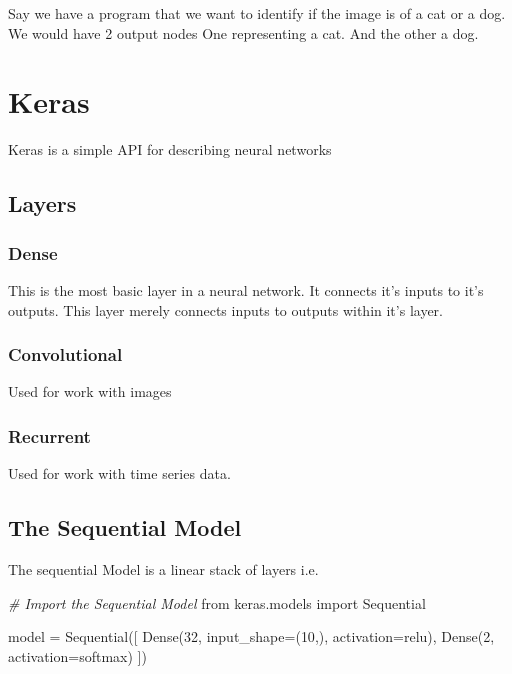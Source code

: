 \documentclass[
]{article}
\newenvironment{Shaded}{}{}
\newcommand{\CommentTok}[1]{\textcolor[rgb]{0.38,0.63,0.69}{\textit{#1}}}
\newcommand{\DecValTok}[1]{\textcolor[rgb]{0.25,0.63,0.44}{#1}}
\newcommand{\ImportTok}[1]{#1}
\newcommand{\NormalTok}[1]{#1}
\newcommand{\OperatorTok}[1]{\textcolor[rgb]{0.40,0.40,0.40}{#1}}
\newcommand{\StringTok}[1]{\textcolor[rgb]{0.25,0.44,0.63}{#1}}
\begin{document}
Say we have a program that we want to identify if the image is of a cat
or a dog. We would have 2 output nodes One representing a cat. And the
other a dog.

\hypertarget{keras}{%
\section{Keras}\label{keras}}

Keras is a simple API for describing neural networks

\hypertarget{layers-1}{%
\subsection{Layers}\label{layers-1}}

\hypertarget{dense}{%
\subsubsection{Dense}\label{dense}}

This is the most basic layer in a neural network. It connects it's
inputs to it's outputs. This layer merely connects inputs to outputs
within it's layer.

\hypertarget{convolutional}{%
\subsubsection{Convolutional}\label{convolutional}}

Used for work with images

\hypertarget{recurrent}{%
\subsubsection{Recurrent}\label{recurrent}}

Used for work with time series data.

\hypertarget{the-sequential-model}{%
\subsection{The Sequential Model}\label{the-sequential-model}}

The sequential Model is a linear stack of layers i.e.

\begin{Shaded}
\begin{Highlighting}[]
\CommentTok{\# Import the Sequential Model}
\ImportTok{from}\NormalTok{ keras.models }\ImportTok{import}\NormalTok{ Sequential}

\NormalTok{model }\OperatorTok{=}\NormalTok{ Sequential([}
\NormalTok{    Dense(}\DecValTok{32}\NormalTok{, input\_shape}\OperatorTok{=}\NormalTok{(}\DecValTok{10}\NormalTok{,), activation}\OperatorTok{=}\StringTok{\textquotesingle{}relu\textquotesingle{}}\NormalTok{),}
\NormalTok{    Dense(}\DecValTok{2}\NormalTok{, activation}\OperatorTok{=}\StringTok{\textquotesingle{}softmax\textquotesingle{}}\NormalTok{)}
\NormalTok{])}
\end{Highlighting}
\end{Shaded}
\end{document}
